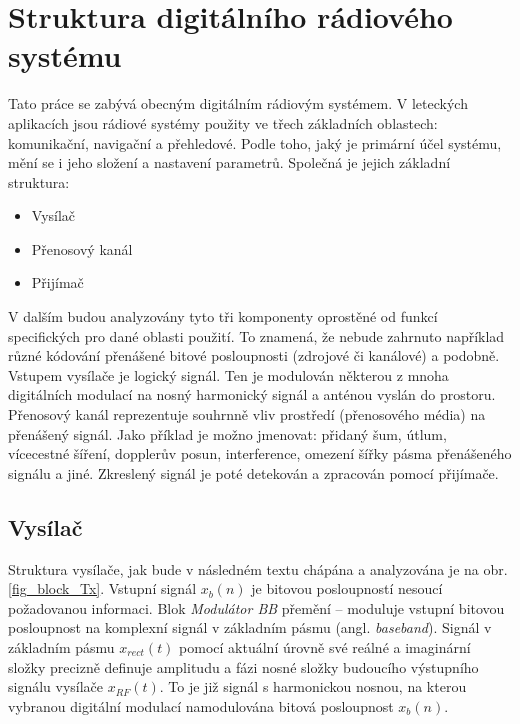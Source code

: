 \section{Struktura digitálního rádiového systému}



\marginpar{\textcolor{txt_blue}{Složení systému}} 
Tato práce se zabývá obecným digitálním rádiovým systémem. V leteckých aplikacích jsou rádiové systémy použity ve třech základních oblastech: komunikační, navigační a přehledové. Podle toho, jaký je primární účel systému, mění se i jeho složení a nastavení parametrů. Společná je jejich základní struktura: 

\begin{itemize}
\item Vysílač
\item Přenosový kanál
\item Přijímač
\end{itemize}

V dalším  budou analyzovány tyto tři komponenty oprostěné od funkcí specifických pro dané oblasti použití. To znamená, že nebude zahrnuto například různé kódování přenášené bitové posloupnosti (zdrojové či kanálové) a podobně. Vstupem vysílače je logický signál. Ten je modulován některou z mnoha digitálních modulací na nosný harmonický signál a anténou vyslán do prostoru. Přenosový kanál reprezentuje souhrnně vliv prostředí (přenosového média) na přenášený signál. Jako příklad je možno jmenovat: přidaný šum, útlum, vícecestné šíření, dopplerův posun, interference, omezení šířky pásma přenášeného signálu a jiné. Zkreslený signál je poté detekován a zpracován pomocí přijímače.


 
\vspace{0.25in}



\subsection{Vysílač}

\marginpar{\textcolor{txt_blue}{Popis struktury vysílače}} 
Struktura vysílače, jak bude v následném textu chápána a analyzována je na obr. \ref{fig_block_Tx}. Vstupní signál $x_b(n)$ je bitovou posloupností nesoucí požadovanou informaci. Blok \textsl{Modulátor BB} přemění -- moduluje vstupní bitovou posloupnost na komplexní signál v základním pásmu (angl. \textsl{baseband}). Signál v základním pásmu $x_{rect}(t)$ pomocí aktuální úrovně své reálné a imaginární složky precizně definuje amplitudu a fázi nosné složky budoucího výstupního signálu vysílače  $x_{RF}(t)$. To je již signál s harmonickou nosnou, na kterou vybranou digitální modulací namodulována bitová posloupnost $x_b(n)$. 

